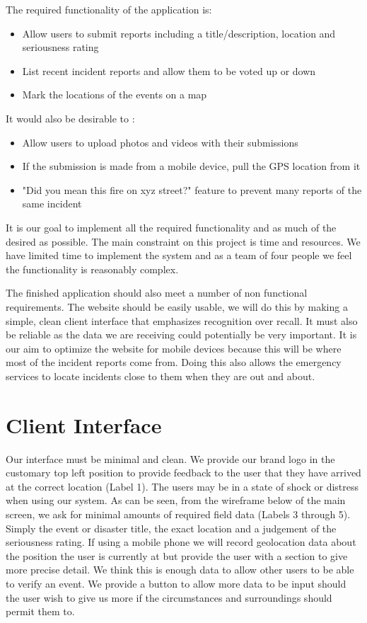 \documentclass{sig-alt-release2}
\begin{document}
The required functionality of the application is:
\begin{itemize}
\item  Allow users to submit reports including a title/description, location and seriousness rating
\item  List recent incident reports and allow them to be voted up or down
\item  Mark the locations of the events on a map
\end{itemize}

It would also be desirable to :

\begin{itemize}
\item  Allow users to upload photos and videos with their submissions
\item  If the submission is made from a mobile device, pull the GPS location from it
\item "Did you mean this fire on xyz street?" feature to prevent many reports of the same incident
\end{itemize}

It is our goal to implement all the required functionality and as much of the desired as possible. The main constraint on this project is time and resources. We have limited time to implement the system and as a team of four people we feel the functionality is reasonably complex.

The finished application should also meet a number of non functional requirements. The website should be easily usable, we will do this by making a simple, clean client interface that emphasizes recognition over recall. It must also be reliable as the data we are receiving could potentially be very important. It is our aim to optimize the website for mobile devices because this will be where most of the incident reports come from. Doing this also allows the emergency services to locate incidents close to them when they are out and about.

\section{Client Interface}
Our interface must be minimal and clean. We provide our brand logo in the customary top left position to provide feedback to the user that they have arrived at the correct location (Label 1). The users may be in a state of shock or distress when using our system. As can be seen, from the wireframe below of the main screen, we ask for minimal amounts of required field data (Labels 3 through 5). Simply the event or disaster title, the exact location and a judgement of the seriousness rating. If using a mobile phone we will record geolocation data about the position the user is currently at but provide the user with a section to give more precise detail. We think this is enough data to allow other users to be able to verify an event. We provide a button to allow more data to be input should the user wish to give us more if the circumstances and surroundings should permit them to.
\end{document}

